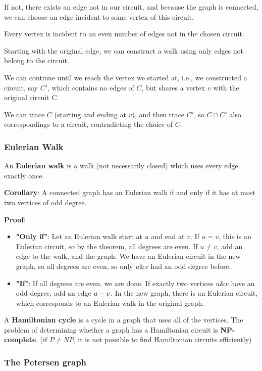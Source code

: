 \documentclass[9pt, letterpaper, oneside]{article}
\begin{document}
If not, there exists an edge not in our circuit, and because the graph is connected, we can choose an edge incident to some vertex of this circuit.

Every vertex is incident to an even number of edges not in the chosen circuit.

Starting with the original edge, we can construct a walk using only edges not belong to the circuit.

We can continue until we reach the vertex we started at, i.e., we constructed a circuit, say $C'$, which contains no edges of $C$, but shares a vertex $v$ with the original circuit C.

We can trace $C$ (starting and ending at $v$), and then trace $C'$, so $C \cap C'$ also correspondings to a circuit, contradicting the choice of $C$.

\subsubsection{Eulerian Walk}
An \textbf{Eulerian walk} is a walk (not necessarily closed) which uses every edge exactly once.

\textbf{Corollary}: A connected graph has an Eulerian walk if and only if it has at most two vertices of odd degree.

\textbf{Proof}:
\begin{itemize}
\item \textbf{"Only if"}: Let an Eulerian walk start at $u$ and end at $v$. If $u = v$, this is an Eulerian circuit, so by the theorem, all degrees are even. If $u \neq v$, add an edge to the walk, and the graph. We have an Eulerian circuit in the new graph, so all degrees are even, so only $u \& v$ had an odd degree before.
\item \textbf{"If"}: If all degrees are even, we are done. If exactly two vertices $u \& v$ have an odd degree, add an edge $u\--v$. In the new graph, there is an Eulerian circuit, which corresponds to an Eulerian walk in the original graph.
\end{itemize}

A \textbf{Hamiltonian cycle} is a cycle in a graph that uses all of the vertices. The problem of determining whether a graph has a Hamiltonian circuit is \textbf{NP-complete}. (if $P \neq NP$, it is not possible to find Hamiltonian circuits efficiently)

\subsubsection{The Petersen graph}
\end{document}
